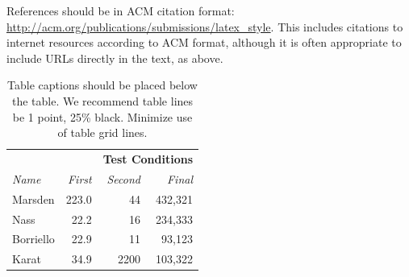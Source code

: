 \documentclass{sigchi}
\begin{document}
References should be in ACM citation format:
\url{http://acm.org/publications/submissions/latex_style}. This
includes citations to internet
resources
according to ACM format, although it is often appropriate to include
URLs directly in the text, as above.




\begin{table}
  \centering
  \begin{tabular}{l r r r}
    & & \multicolumn{2}{c}{\small{\textbf{Test Conditions}}} \\
    \cmidrule(r){3-4}
    {\small\textit{Name}}
    & {\small \textit{First}}
      & {\small \textit{Second}}
    & {\small \textit{Final}} \\
    \midrule
    Marsden & 223.0 & 44 & 432,321 \\
    Nass & 22.2 & 16 & 234,333 \\
    Borriello & 22.9 & 11 & 93,123 \\
    Karat & 34.9 & 2200 & 103,322 \\
  \end{tabular}
  \caption{Table captions should be placed below the table. We
    recommend table lines be 1 point, 25\% black. Minimize use of
    table grid lines.}~\label{tab:table1}
\end{table}
\end{document}
